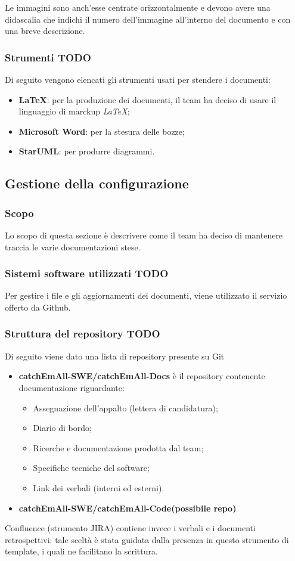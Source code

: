 Le immagini sono anch'esse centrate orizzontalmente e devono avere una didascalia che indichi il numero dell'immagine all'interno del documento e con una breve descrizione.

\subsubsection{Strumenti TODO}
Di seguito vengono elencati gli strumenti usati per stendere i documenti:
\begin {itemize}
\item \textbf{\LaTeX}: per la produzione dei documenti, il team ha deciso di usare il linguaggio di marckup \textit{\LaTeX};
\item \textbf{Microsoft Word}: per la stesura delle bozze;
\item \textbf{StarUML}: per produrre diagrammi.
\end {itemize}


\subsection{Gestione della configurazione}

\subsubsection{Scopo}
Lo scopo di questa sezione è descrivere come il team ha deciso di mantenere traccia le varie documentazioni stese.

\subsubsection{Sistemi software utilizzati TODO}
Per gestire i file e gli aggiornamenti dei documenti, viene utilizzato il servizio offerto da Github.

\subsubsection{Struttura del repository TODO}
Di seguito viene dato una lista di repository presente su Git
\begin{itemize}
\item \textbf{catchEmAll-SWE/catchEmAll-Docs} è il repository contenente documentazione riguardante:
\begin{itemize}
    \item Assegnazione dell'appalto (lettera di candidatura);
    \item Diario di bordo;
    \item Ricerche e documentazione prodotta dal team;
    \item Specifiche tecniche del software;
    \item Link dei verbali (interni ed esterni).
\end{itemize}
\item \textbf{catchEmAll-SWE/catchEmAll-Code(possibile repo)}
\end{itemize}
Confluence (strumento JIRA) contiene invece i verbali e i documenti retrospettivi: tale sceltà è stata guidata dalla presenza in questo strumento di template, i quali ne facilitano la scrittura.

